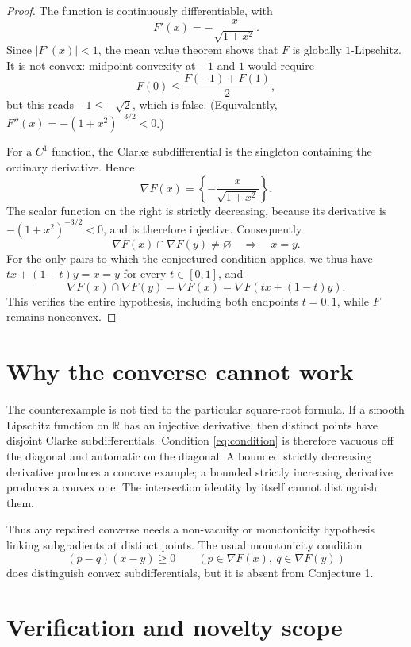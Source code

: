 \documentclass[11pt]{article}
\newcommand{\R}{\mathbb R}
\begin{document}
\begin{proof}
The function is continuously differentiable, with
\begin{equation}\label{eq:derivative}
 F'(x)=-\frac{x}{\sqrt{1+x^2}}.
\end{equation}
Since $|F'(x)|<1$, the mean value theorem shows that $F$ is globally
$1$-Lipschitz.  It is not convex: midpoint convexity at $-1$ and $1$ would
require
\[
 F(0)\leq\frac{F(-1)+F(1)}2,
\]
but this reads $-1\leq-\sqrt2$, which is false.  (Equivalently,
$F''(x)=-(1+x^2)^{-3/2}<0$.)

For a $C^1$ function, the Clarke subdifferential is the singleton containing
the ordinary derivative.  Hence
\[
 \nabla F(x)=\left\{-\frac{x}{\sqrt{1+x^2}}\right\}.
\]
The scalar function on the right is strictly decreasing, because its
derivative is $-(1+x^2)^{-3/2}<0$, and is therefore injective.  Consequently
\[
 \nabla F(x)\cap\nabla F(y)\ne\varnothing
 \quad\Longrightarrow\quad x=y.
\]
For the only pairs to which the conjectured condition applies, we thus have
$tx+(1-t)y=x=y$ for every $t\in[0,1]$, and
\[
 \nabla F(x)\cap\nabla F(y)
 =\nabla F(x)
 =\nabla F(tx+(1-t)y).
\]
This verifies the entire hypothesis, including both endpoints $t=0,1$, while
$F$ remains nonconvex.
\end{proof}

\section{Why the converse cannot work}

The counterexample is not tied to the particular square-root formula.  If a
smooth Lipschitz function on $\R$ has an injective derivative, then distinct
points have disjoint Clarke subdifferentials.  Condition
\eqref{eq:condition} is therefore vacuous off the diagonal and automatic on
the diagonal.  A bounded strictly decreasing derivative produces a concave
example; a bounded strictly increasing derivative produces a convex one.
The intersection identity by itself cannot distinguish them.

Thus any repaired converse needs a non-vacuity or monotonicity hypothesis
linking subgradients at distinct points.  The usual monotonicity condition
\[
 (p-q)(x-y)\geq0
 \qquad(p\in\nabla F(x),\ q\in\nabla F(y))
\]
does distinguish convex subdifferentials, but it is absent from Conjecture 1.

\section{Verification and novelty scope}
\end{document}
